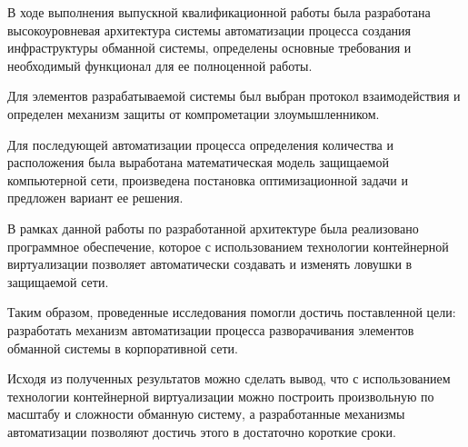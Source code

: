 
В ходе выполнения выпускной квалификационной работы была разработана высокоуровневая архитектура системы автоматизации процесса создания инфраструктуры обманной системы, определены основные требования и необходимый функционал для ее полноценной работы.

Для элементов разрабатываемой системы был выбран протокол взаимодействия и определен механизм защиты от компрометации злоумышленником.

Для последующей автоматизации процесса определения количества и расположения была выработана математическая модель защищаемой компьютерной сети, произведена постановка оптимизационной задачи и предложен вариант ее решения.

В рамках данной работы по разработанной архитектуре была реализовано программное обеспечение, которое с использованием технологии контейнерной виртуализации позволяет автоматически создавать и изменять ловушки в защищаемой сети.

Таким образом, проведенные исследования помогли достичь  поставленной цели: разработать механизм автоматизации процесса разворачивания элементов обманной системы в корпоративной сети.

Исходя из полученных результатов можно сделать вывод, что с использованием технологии контейнерной виртуализации можно построить произвольную по масштабу и сложности обманную систему, а разработанные механизмы автоматизации позволяют достичь этого в достаточно короткие сроки.